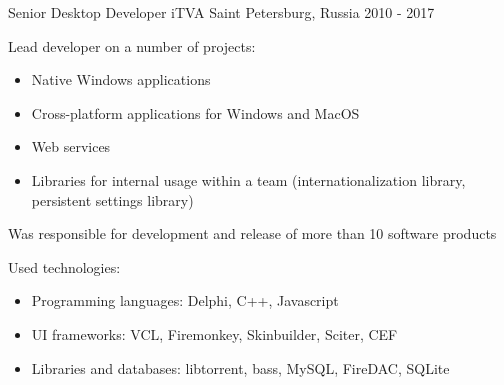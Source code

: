 

\begin{cventries}

  \cventry
    {Senior Desktop Developer} %
    {iTVA} %
    {Saint Petersburg, Russia} %
    {2010 - 2017} %
    {
      \begin{cvitems} %
        \item Lead developer on a number of projects:
          \begin{itemize} %
            \item Native Windows applications
            \item Cross-platform applications for Windows and MacOS
            \item Web services
            \item Libraries for internal usage within a team (internationalization library, persistent settings library)
          \end{itemize}
        \item Was responsible for development and release of more than 10 software products 
        \item Used technologies:
          \begin{itemize} %
            \item Programming languages: Delphi, C++, Javascript
            \item UI frameworks: VCL, Firemonkey, Skinbuilder, Sciter, CEF
            \item Libraries and databases: libtorrent, bass, MySQL, FireDAC, SQLite
          \end{itemize}
      \end{cvitems}
    }


\end{cventries}
